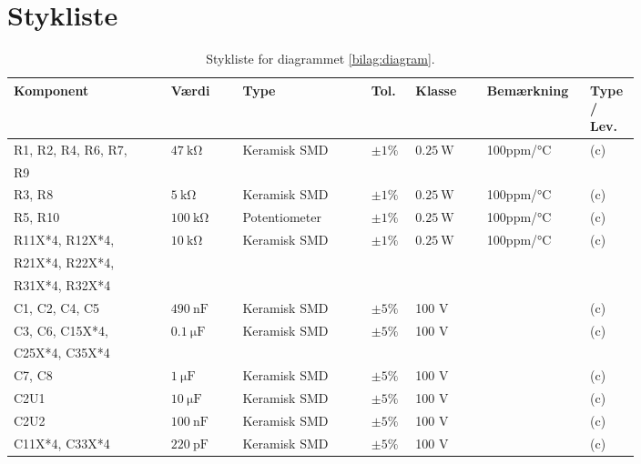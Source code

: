 \chapter{Stykliste} \label{bilag:styklister}
\begin{table}[h!]
\small
\caption{Stykliste for diagrammet \ref{bilag:diagram}.}
\label{tab:styklister}
\begin{threeparttable}
\begin{tabular}{p{0.22\linewidth}p{0.1\linewidth}p{0.18\linewidth}p{0.05\linewidth}p{0.1\linewidth}p{0.1\linewidth}p{0.05\linewidth}}
\toprule
\multicolumn{1}{l}{\textbf{Komponent}}       &
\multicolumn{1}{l}{\textbf{Værdi}}       &
\multicolumn{1}{l}{\textbf{Type}}       &
\multicolumn{1}{l}{\textbf{Tol.}} &
\multicolumn{1}{l}{\textbf{Klasse}} &
\multicolumn{1}{l}{\textbf{Bemærkning}} &
\multicolumn{1}{l}{\textbf{Type / Lev.}}  \\ 
\hline
R1, R2, R4, R6, R7,& $\SI{47}{\kilo\ohm}$ & Keramisk SMD & $\pm 1\%$ & $\SI{0.25}{\watt}$ & 100ppm/\si{\celsius} & (c) \\
R9 &&&&&& \\
R3, R8 & $\SI{5}{\kilo\ohm}$ & Keramisk SMD	& $\pm 1\%$ & $\SI{0.25}{\watt}$ & 100ppm/\si{\celsius}  & (c) \\
R5, R10 & $\SI{100}{\kilo\ohm}$ & Potentiometer	& $\pm 1\%$ & $\SI{0.25}{\watt}$ & 100ppm/\si{\celsius}  & (c) \\
R11X*4, R12X*4, & $\SI{10}{\kilo\ohm}$ & Keramisk SMD	& $\pm 1\%$ & $\SI{0.25}{\watt}$ & 100ppm/\si{\celsius}  & (c) \\
R21X*4, R22X*4, &&&&&& \\
R31X*4, R32X*4 &&&&&& \\
\midrule
C1, C2, C4, C5 & $\SI{490}{\nano\farad}$ & Keramisk SMD & $\pm 5\%$ & 100 \si{\volt} &  & (c)\\
C3, C6, C15X*4, & $\SI{0,1}{\micro\farad}$ & Keramisk SMD & $\pm 5\%$ & 100 \si{\volt} &  & (c)\\
C25X*4, C35X*4 &&&&&&\\
C7, C8 & $\SI{1}{\micro\farad}$ & Keramisk SMD & $\pm 5\%$ & 100 \si{\volt} &  & (c)\\
C2U1 & $\SI{10}{\micro\farad}$ & Keramisk SMD & $\pm 5\%$ & 100 \si{\volt} &  & (c)\\
C2U2 & $\SI{100}{\nano\farad}$ & Keramisk SMD & $\pm 5\%$ & 100 \si{\volt} &  & (c)\\
C11X*4, C33X*4 & $\SI{220}{\pico\farad}$ & Keramisk SMD & $\pm 5\%$ & 100 \si{\volt} &  & (c)\\

\end{tabular}
\end{threeparttable}
\end{table}
